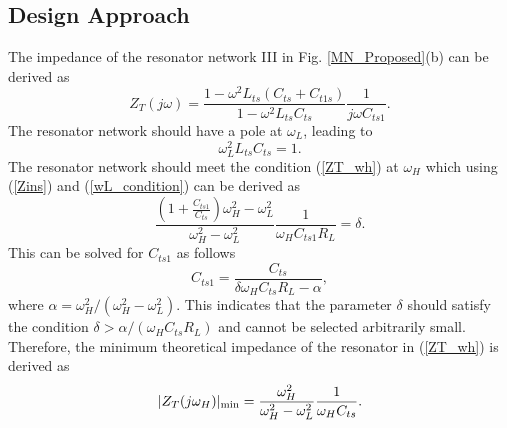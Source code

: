 \documentclass{IEEEtran}
\begin{document}
\subsection{Design Approach}
The impedance of the resonator network III in Fig. \ref{MN_Proposed}(b) can be derived as
\begin{equation}\label{Zins}
 Z_{T}(j\omega)= \frac{1-\omega^2 L_{ts}(C_{ts}+C_{t1s})}{1-\omega^2 L_{ts}C_{ts}} \frac{1}{j \omega C_{ts1}}.
\end{equation}
The resonator network should have a pole at $\omega_L$, leading to
\begin{equation}
    \label{wL_condition}
    \omega_L^2 L_{ts} C_{ts} = 1.
\end{equation}
The resonator network should meet the condition (\ref{ZT_wh}) at $\omega_H$ which using (\ref{Zins}) and (\ref{wL_condition}) can be derived as
\begin{equation}
    \label{wH_condition}
    \frac{\left( 1 + \frac{C_{ts1}}{C_{ts}} \right) \omega_H^2 - \omega_L^2}{\omega_H^2 - \omega_L^2}  \frac{1}{\omega_H C_{ts1} R_L} = \delta.
\end{equation}
This can be solved for $C_{ts1}$ as follows
\begin{equation}
    \label{whH_condition2}
    C_{ts1} = \frac{C_{ts}}{{\delta} \omega_HC_{ts}R_L - \alpha},
\end{equation}
where $\alpha = \omega_H^2/(\omega_H^2 - \omega_L^2)$. This indicates that the parameter $\delta$ should satisfy the condition $\delta > \alpha/(\omega_H C_{ts} R_L)$ and cannot be selected arbitrarily small. Therefore, the minimum theoretical impedance of the resonator in (\ref{ZT_wh}) is derived as 
\begin{equation}
    \label{ZT_wh_min}
    |Z_T(j\omega_H)|_{\rm min} = \frac{\omega_H^2}{\omega_H^2 - \omega_L^2} \frac{1}{\omega_H C_{ts}}.
\end{equation}




\end{document}
